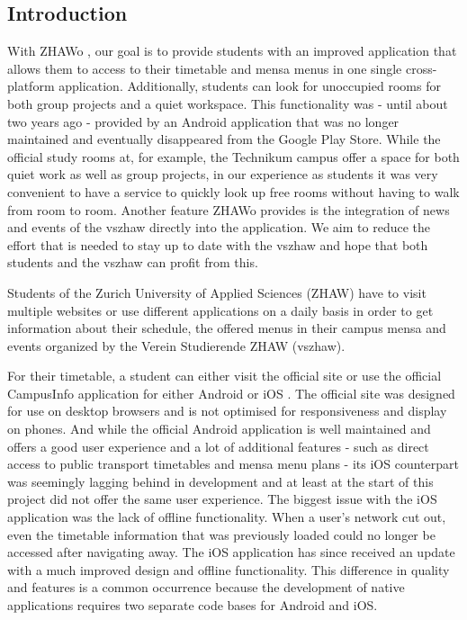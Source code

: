 \begin{markdown}
\section{Introduction} \label{introduction}

With ZHAWo \cite{OurHost}, our goal is to provide students with an improved application that allows them to access to their timetable and mensa menus in one single cross-platform application. Additionally, students can look for unoccupied rooms for both group projects and a quiet workspace. This functionality was - until about two years ago - provided by an Android application that was no longer maintained and eventually disappeared from the Google Play Store. While the official study rooms at, for example, the Technikum campus offer a space for both quiet work as well as group projects, in our experience as students it was very convenient to have a service to quickly look up free rooms without having to walk from room to room. Another feature ZHAWo provides is the integration of news \cite{VszhawNews} and events \cite{VszhawCalendar} of the vszhaw directly into the application. We aim to reduce the effort that is needed to stay up to date with the vszhaw and hope that both students and the vszhaw can profit from this.

Students of the Zurich University of Applied Sciences (ZHAW) have to visit multiple websites or use different applications on a daily basis in order to get information about their schedule, the offered menus in their campus mensa and events organized by the Verein Studierende ZHAW (vszhaw).

For their timetable, a student can either visit the official site \cite{Stundenplan} or use the official CampusInfo application for either Android \cite{AppAndroid} or iOS \cite{AppIOS}. The official site was designed for use on desktop browsers and is not optimised for responsiveness and display on phones. And while the official Android application is well maintained and offers a good user experience and a lot of additional features - such as direct access to public transport timetables and mensa menu plans - its iOS counterpart was seemingly lagging behind in development and at least at the start of this project did not offer the same user experience. The biggest issue with the iOS application was the lack of offline functionality. When a user's network cut out, even the timetable information that was previously loaded could no longer be accessed after navigating away. The iOS application has since received an update with a much improved design and offline functionality. This difference in quality and features is a common occurrence because the development of native applications requires two separate code bases for Android and iOS. 


\end{markdown}
